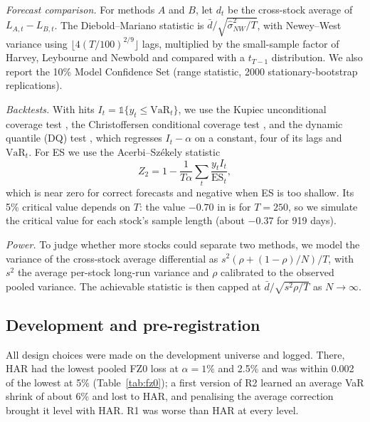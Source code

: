 \documentclass[conference]{IEEEtran}
\begin{document}
\textit{Forecast comparison.} For methods $A$ and $B$, let $d_t$ be the cross-stock average of $L_{A,t}-L_{B,t}$. The Diebold--Mariano statistic \cite{diebold1995} is $\bar d/\sqrt{\hat\sigma^2_{NW}/T}$, with Newey--West variance using $\lfloor 4(T/100)^{2/9}\rfloor$ lags, multiplied by the small-sample factor of Harvey, Leybourne and Newbold \cite{harvey1997} and compared with a $t_{T-1}$ distribution. We also report the 10\% Model Confidence Set \cite{hansen2011} (range statistic, 2000 stationary-bootstrap replications).

\textit{Backtests.} With hits $I_t=\mathbb 1\{y_t\le\mathrm{VaR}_t\}$, we use the Kupiec unconditional coverage test \cite{kupiec1995}, the Christoffersen conditional coverage test \cite{christoffersen1998}, and the dynamic quantile (DQ) test \cite{engle2004}, which regresses $I_t-\alpha$ on a constant, four of its lags and $\mathrm{VaR}_t$. For ES we use the Acerbi--Sz\'ekely statistic \cite{acerbi2014}
\begin{equation}
Z_2=1-\frac{1}{T\alpha}\sum_t \frac{y_t I_t}{\mathrm{ES}_t},
\end{equation}
which is near zero for correct forecasts and negative when ES is too shallow. Its 5\% critical value depends on $T$: the value $-0.70$ in \cite{acerbi2014} is for $T=250$, so we simulate the critical value for each stock's sample length (about $-0.37$ for 919 days).

\textit{Power.} To judge whether more stocks could separate two methods, we model the variance of the cross-stock average differential as $s^2(\rho+(1-\rho)/N)/T$, with $s^2$ the average per-stock long-run variance and $\rho$ calibrated to the observed pooled variance. The achievable statistic is then capped at $\bar d/\sqrt{s^2\rho/T}$ as $N\to\infty$.

\subsection{Development and pre-registration}\label{sec:prereg}

All design choices were made on the development universe and logged. There, HAR had the lowest pooled FZ0 loss at $\alpha=1\%$ and 2.5\% and was within 0.002 of the lowest at 5\% (Table~\ref{tab:fz0}); a first version of R2 learned an average VaR shrink of about 6\% and lost to HAR, and penalising the average correction brought it level with HAR. R1 was worse than HAR at every level.
\end{document}
